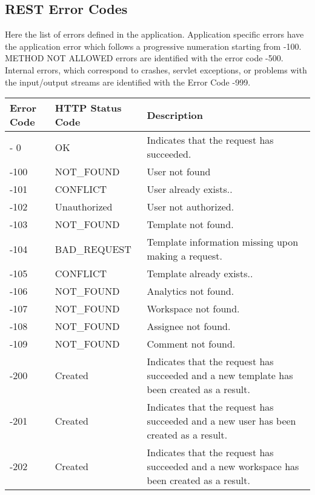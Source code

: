 \subsection{REST Error Codes}

Here the list of errors defined in the application. Application specific errors have the application error which follows a progressive numeration starting from -100. METHOD NOT ALLOWED errors are identified with the error code -500. Internal errors, which correspond to crashes, servlet exceptions, or problems with the input/output streams are identified with the Error Code -999.

\begin{longtable}{|p{}|p{} |p{}|} 
\hline
\textbf{Error Code} & \textbf{HTTP Status Code} & \textbf{Description} \\\hline
-  0  & OK                       & Indicates that the request has succeeded. \\ \hline
-100  & NOT\_FOUND               & User not found\\ \hline
-101  & CONFLICT                 & User already exists.. \\ \hline
-102  & Unauthorized             & User not authorized. \\ \hline
-103  & NOT\_FOUND               & Template not found.\\ \hline
-104  & BAD\_REQUEST             & Template information missing upon making a request. \\ \hline
-105  & CONFLICT                 & Template already exists.. \\ \hline
-106  & NOT\_FOUND               & Analytics not found.\\ \hline
-107  & NOT\_FOUND               & Workspace not found.\\ \hline
-108  & NOT\_FOUND               & Assignee not found.\\ \hline
-109  & NOT\_FOUND               & Comment not found.\\ \hline
-200  & Created                  & Indicates that the request has succeeded and a new template has been created as a result. \\ \hline
-201  & Created                  & Indicates that the request has succeeded and a new user has been created as a result. \\ \hline
-202  & Created                  & Indicates that the request has succeeded and a new workspace has been created as a result. \\ \hline

\end{longtable}

